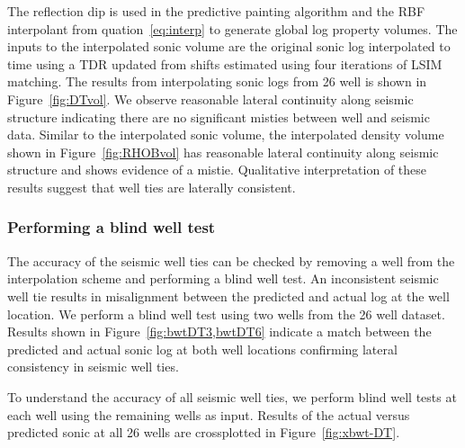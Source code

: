 
The reflection dip is used in the predictive painting algorithm and the RBF interpolant from \old{}quation~\ref{eq:interp} to generate global log property volumes. The inputs to the interpolated sonic volume are the original sonic log interpolated to time using a TDR updated from shifts estimated using four iterations of LSIM matching. The results from interpolating sonic logs from 26 well is shown in Figure~\ref{fig:DTvol}. We observe reasonable lateral continuity along seismic structure indicating there are no significant misties between well and seismic data. Similar to the interpolated sonic volume, the interpolated density volume shown in Figure~\ref{fig:RHOBvol} has reasonable lateral continuity along seismic structure and shows  evidence of a mistie. Qualitative interpretation of these results suggest that  well ties are laterally consistent.


\subsubsection{Performing a blind well test}
The accuracy of the seismic well ties can be   checked by removing a well from the interpolation scheme and performing a blind well test. An inconsistent seismic well tie results in misalignment between the predicted and actual log at the well location. We perform a blind well test using two wells from the 26 well dataset. Results shown in Figure~\ref{fig:bwtDT3,bwtDT6} indicate a  match between the predicted and actual sonic log at both well locations confirming lateral consistency in seismic well ties.

To understand the accuracy of all seismic well ties, we  perform blind well tests at each well using the remaining wells as input. Results of the actual versus predicted sonic at all 26 wells are crossplotted in Figure~\ref{fig:xbwt-DT}.

